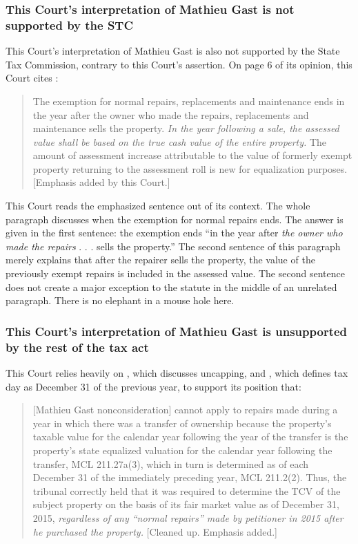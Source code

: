 \documentclass[12pt,\documentclassflag]{michiganCourtOfAppealsBrief}
\begin{document}
\subsubsection{This Court's interpretation of Mathieu Gast is not supported by the STC}

This Court's interpretation of Mathieu Gast is also not supported by the State Tax Commission, contrary to this Court's assertion. On page 6 of its opinion, this Court cites :

\begin{quote}
The exemption for normal repairs, replacements and maintenance ends in the year after the
owner who made the repairs, replacements and maintenance sells the property. \emph{In the year
following a sale, the assessed value shall be based on the true cash value of the entire property.}
The amount of assessment increase attributable to the value of formerly exempt property
returning to the assessment roll is new for equalization purposes. [Emphasis added by this Court.]
\end{quote}

This Court reads the emphasized sentence out of its context. The whole paragraph discusses when the exemption for normal repairs ends. The answer is given in the first sentence: the exemption ends ``in the year after \emph{the owner who made the repairs} . . . sells the property.'' The second sentence of this paragraph merely explains that after the repairer sells the property, the value of the previously exempt repairs is included in the assessed value. The second sentence does not create a major exception to the statute in the middle of an unrelated paragraph. There is no elephant in a mouse hole here.

\subsubsection{This Court's interpretation of Mathieu Gast is unsupported by the rest of the tax act}

This Court relies heavily on \cite{MCL 211.27a}, which discusses uncapping, and \cite{MCL 211.2(2)}, which defines tax day as December 31 of the previous year, to support its position that:

\begin{quote}
  [Mathieu Gast nonconsideration] cannot apply to repairs made
during a year in which there was a transfer of ownership because the property's taxable value for
the calendar year following the year of the transfer is the property's state equalized valuation for
the calendar year following the transfer, MCL 211.27a(3), which in turn is determined as of each
December 31 of the immediately preceding year, MCL 211.2(2). 
Thus, the tribunal correctly
held that it was required to determine the TCV of the subject property on the basis of its fair market 
value as of December 31, 2015, \emph{regardless of any ``normal repairs'' made by petitioner in 2015
after he purchased the property.} [Cleaned up. Emphasis added.]
\end{quote}
\end{document}
